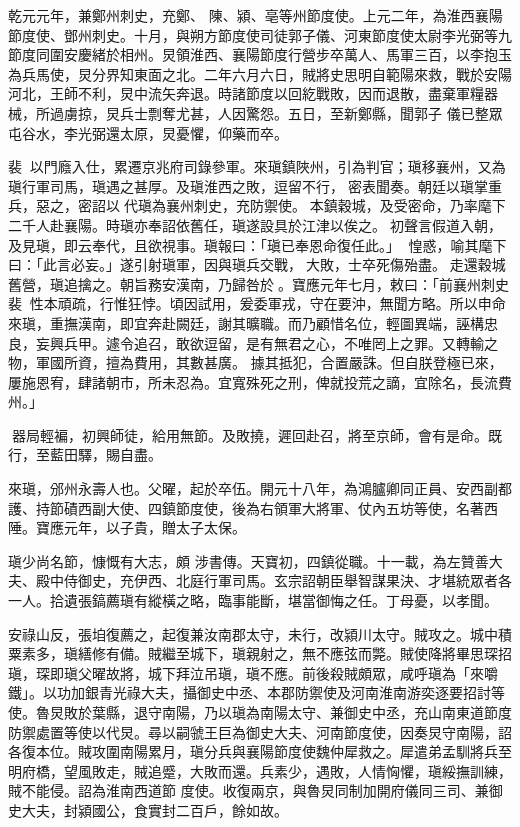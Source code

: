 \begin{pinyinscope}
 乾元元年，兼鄭州刺史，充鄭、
 陳、潁、亳等州節度使。上元二年，為淮西襄陽節度使、鄧州刺史。十月，與朔方節度使司徒郭子儀、河東節度使太尉李光弼等九節度同圍安慶緒於相州。炅領淮西、襄陽節度行營步卒萬人、馬軍三百，以李抱玉為兵馬使，炅分界知東面之北。二年六月六日，賊將史思明自範陽來救，戰於安陽河北，王師不利，炅中流矢奔退。時諸節度以回紇戰敗，因而退散，盡棄軍糧器械，所過虜掠，炅兵士剽奪尤甚，人因驚怨。五日，至新鄭縣，聞郭子
 儀已整眾屯谷水，李光弼還太原，炅憂懼，仰藥而卒。



 裴，以門廕入仕，累遷京兆府司錄參軍。來瑱鎮陜州，引為判官；瑱移襄州，又為瑱行軍司馬，瑱遇之甚厚。及瑱淮西之敗，逗留不行，密表聞奏。朝廷以瑱掌重兵，惡之，密詔以代瑱為襄州刺史，充防禦使。本鎮穀城，及受密命，乃率麾下二千人赴襄陽。時瑱亦奉詔依舊任，瑱遂設具於江津以俟之。初聲言假道入朝，及見瑱，即云奉代，且欲視事。瑱報曰：「瑱已奉恩命復任此。」
 惶惑，喻其麾下曰：「此言必妄。」遂引射瑱軍，因與瑱兵交戰，大敗，士卒死傷殆盡。走還穀城舊營，瑱追擒之。朝旨務安漢南，乃歸咎於。寶應元年七月，敕曰：「前襄州刺史裴，性本頑疏，行惟狂悖。頃因試用，爰委軍戎，守在要沖，無聞方略。所以申命來瑱，重撫漢南，即宜奔赴闕廷，謝其曠職。而乃顧惜名位，輕圖異端，誣構忠良，妄興兵甲。遽令追召，敢欲逗留，是有無君之心，不唯罔上之罪。又轉輸之物，軍國所資，擅為費用，其數甚廣。
 據其抵犯，合置嚴誅。但自朕登極已來，屢施恩宥，肆諸朝市，所未忍為。宜寬殊死之刑，俾就投荒之謫，宜除名，長流費州。」



 器局輕褊，初興師徒，給用無節。及敗撓，遲回赴召，將至京師，會有是命。既行，至藍田驛，賜自盡。



 來瑱，邠州永壽人也。父曜，起於卒伍。開元十八年，為鴻臚卿同正員、安西副都護、持節磧西副大使、四鎮節度使，後為右領軍大將軍、仗內五坊等使，名著西陲。寶應元年，以子貴，贈太子太保。



 瑱少尚名節，慷慨有大志，頗
 涉書傳。天寶初，四鎮從職。十一載，為左贊善大夫、殿中侍御史，充伊西、北庭行軍司馬。玄宗詔朝臣舉智謀果決、才堪統眾者各一人。拾遺張鎬薦瑱有縱橫之略，臨事能斷，堪當御悔之任。丁母憂，以孝聞。



 安祿山反，張垍復薦之，起復兼汝南郡太守，未行，改潁川太守。賊攻之。城中積粟素多，瑱繕修有備。賊繼至城下，瑱親射之，無不應弦而斃。賊使降將畢思琛招瑱，琛即瑱父曜故將，城下拜泣吊瑱，瑱不應。前後殺賊頗眾，咸呼瑱為「來嚼
 鐵」。以功加銀青光祿大夫，攝御史中丞、本郡防禦使及河南淮南游奕逐要招討等使。魯炅敗於葉縣，退守南陽，乃以瑱為南陽太守、兼御史中丞，充山南東道節度防禦處置等使以代炅。尋以嗣虢王巨為御史大夫、河南節度使，因奏炅守南陽，詔各復本位。賊攻圍南陽累月，瑱分兵與襄陽節度使魏仲犀救之。犀遣弟孟馴將兵至明府橋，望風敗走，賊追蹙，大敗而還。兵素少，遇敗，人情恟懼，瑱綏撫訓練，賊不能侵。詔為淮南西道節
 度使。收復兩京，與魯炅同制加開府儀同三司、兼御史大夫，封潁國公，食實封二百戶，餘如故。




\end{pinyinscope}
